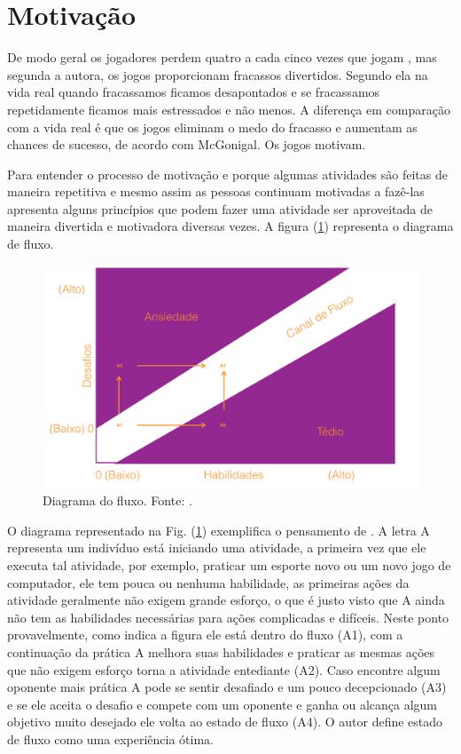 \section{Motivação}

De modo geral os jogadores perdem quatro a cada cinco vezes que jogam \cite{mcgonigal2011reality}, mas segunda a autora, os jogos proporcionam fracassos divertidos. Segundo ela na vida real quando fracassamos ficamos desapontados e se fracassamos repetidamente ficamos mais estressados e não menos. A diferença em comparação com a vida real é que os jogos eliminam o medo do fracasso e aumentam as chances de sucesso, de acordo com McGonigal. Os jogos motivam.

Para entender o processo de motivação e porque algumas atividades são feitas de maneira repetitiva e mesmo assim as pessoas continuam motivadas a fazê-las \cite{1990flow} apresenta alguns princípios que podem fazer uma atividade ser aproveitada de maneira divertida e motivadora diversas vezes. A figura (\ref{flowfig}) representa o diagrama de fluxo.


\begin{figure}[h]
	\centering
		\includegraphics[keepaspectratio=true,scale=0.5]{figuras/flowfig.png}
	\caption{Diagrama do fluxo. Fonte: \cite{1990flow}.\label{flowfig}
}
\end{figure}


O diagrama representado na Fig. (\ref{flowfig}) exemplifica o pensamento de \cite{1990flow}. A letra A representa um indivíduo está iniciando uma atividade, a primeira vez que ele executa tal atividade, por exemplo, praticar um esporte novo ou um novo jogo de computador, ele tem pouca ou nenhuma habilidade, as primeiras ações da atividade geralmente não exigem grande esforço, o que é justo visto que A ainda não tem as habilidades necessárias para ações complicadas e difíceis. Neste ponto provavelmente, como indica a figura ele está dentro do fluxo (A1), com a continuação da prática A melhora suas habilidades e praticar as mesmas ações que não exigem esforço torna a atividade entediante (A2). Caso encontre algum oponente mais prática A pode se sentir desafiado e um pouco decepcionado (A3) e se ele aceita o desafio e compete com um oponente e ganha ou alcança algum objetivo muito desejado ele volta ao estado de fluxo (A4). O autor define estado de fluxo como uma experiência ótima.

